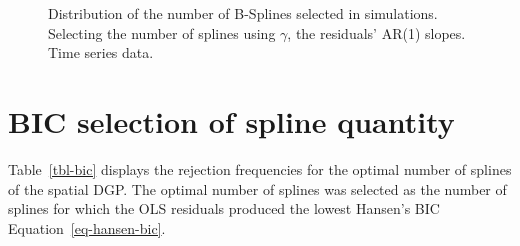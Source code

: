 \documentclass[
]{article}
\begin{document}
\begin{figure}

\begin{minipage}[t]{0.50\linewidth}

{\centering 


}

\end{minipage}%
%
\begin{minipage}[t]{0.50\linewidth}

{\centering 


}

\end{minipage}%

\caption{\label{fig-gamma-splines-ts}Distribution of the number of
B-Splines selected in simulations. Selecting the number of splines using
\(\gamma\), the residuals' AR(1) slopes. Time series data.}

\end{figure}

\hypertarget{bic-selection-of-spline-quantity}{%
\section{BIC selection of spline
quantity}\label{bic-selection-of-spline-quantity}}

Table~\ref{tbl-bic} displays the rejection frequencies for the optimal
number of splines of the spatial DGP. The optimal number of splines was
selected as the number of splines for which the OLS residuals produced
the lowest Hansen's BIC Equation~\ref{eq-hansen-bic}.
\end{document}
